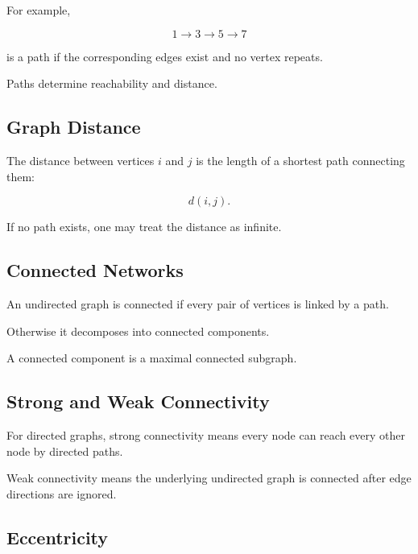 For example,

\[
\boxed{
1\to3\to5\to7
}
\]

is a path if the corresponding edges exist and no vertex repeats.

Paths determine reachability and distance.

\subsection{Graph Distance}
\label{subsec:graph-distance-network}

The distance between vertices \(i\) and \(j\) is the length of a shortest
path connecting them:

\[
\boxed{
d(i,j).
}
\]

If no path exists, one may treat the distance as infinite.

\subsection{Connected Networks}
\label{subsec:connected-networks}

An undirected graph is connected if every pair of vertices is linked by a
path.

Otherwise it decomposes into connected components.

A connected component is a maximal connected subgraph.

\subsection{Strong and Weak Connectivity}
\label{subsec:strong-weak-connectivity}

For directed graphs, strong connectivity means every node can reach every
other node by directed paths.

Weak connectivity means the underlying undirected graph is connected after
edge directions are ignored.

\subsection{Eccentricity}
\label{subsec:network-eccentricity}

